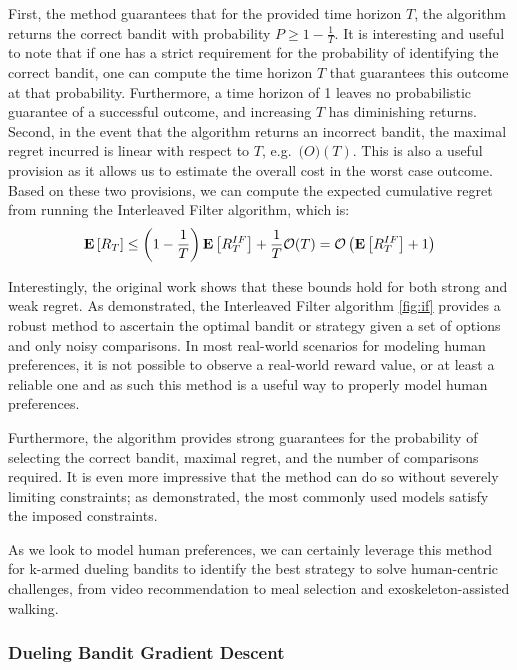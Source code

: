 \documentclass[
  letterpaper,
  DIV=11,
  numbers=noendperiod,
  oneside]{scrreprt}
\theoremstyle{remark}
\begin{document}
First, the method guarantees that for the provided time horizon \(T\),
the algorithm returns the correct bandit with probability
\(P \ge 1 - \frac{1}{T}\). It is interesting and useful to note that if
one has a strict requirement for the probability of identifying the
correct bandit, one can compute the time horizon \(T\) that guarantees
this outcome at that probability. Furthermore, a time horizon of 1
leaves no probabilistic guarantee of a successful outcome, and
increasing \(T\) has diminishing returns. Second, in the event that the
algorithm returns an incorrect bandit, the maximal regret incurred is
linear with respect to \(T\), e.g.~\(\mathcal(O)(T)\). This is also a
useful provision as it allows us to estimate the overall cost in the
worst case outcome. Based on these two provisions, we can compute the
expected cumulative regret from running the Interleaved Filter
algorithm, which is:
\[\mathbf{E}\left[R_T\right] \le \left(1 - \frac{1}{T}\right) \mathbf{E}\left[ R_T^{IF} \right] + \frac{1}{T}\mathcal{O}(T) \\
= \mathcal{O}\left(\mathbf{E}\left[ R_T^{IF} \right] + 1\right)\]

Interestingly, the original work shows that these bounds hold for both
strong and weak regret. As demonstrated, the Interleaved Filter
algorithm \hyperref[fig:if]{{[}fig:if{]}} provides a robust method to
ascertain the optimal bandit or strategy given a set of options and only
noisy comparisons. In most real-world scenarios for modeling human
preferences, it is not possible to observe a real-world reward value, or
at least a reliable one and as such this method is a useful way to
properly model human preferences.

Furthermore, the algorithm provides strong guarantees for the
probability of selecting the correct bandit, maximal regret, and the
number of comparisons required. It is even more impressive that the
method can do so without severely limiting constraints; as demonstrated,
the most commonly used models satisfy the imposed constraints.

As we look to model human preferences, we can certainly leverage this
method for k-armed dueling bandits to identify the best strategy to
solve human-centric challenges, from video recommendation to meal
selection and exoskeleton-assisted walking.

\subsubsection{Dueling Bandit Gradient
Descent}\label{dueling-bandit-gradient-descent}
\end{document}
